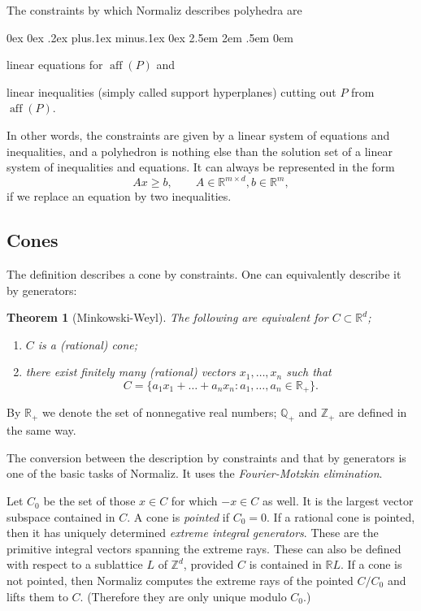 \documentclass[12pt,a4paper]{scrartcl}
\newcounter{listi}
\newcommand{\stdli}{ \topsep0ex \partopsep0ex %
\parsep.2ex plus.1ex minus.1ex \itemsep0ex%
\leftmargin2.5em \labelwidth2em \labelsep.5em \rightmargin0em}%
\newenvironment{arab}{\begin{list}{\textup{(\arabic{listi})}}%
	{\usecounter{listi}\stdli}}{\end{list}}
\newtheorem{theorem}{Theorem}
\theoremstyle{definition}
\def\ZZ{{\mathbb Z}}
\def\QQ{{\mathbb Q}}
\def\RR{{\mathbb R}}
\DeclareMathOperator{\aff}{aff}
\begin{document}
The constraints by which Normaliz describes polyhedra are
\begin{arab}
	\item linear equations for $\aff(P)$ and
	\item linear inequalities (simply called support hyperplanes) cutting out $P$ from $\aff(P)$.
\end{arab}
In other words, the constraints are given by a linear system of equations and inequalities, and a polyhedron is nothing else than the solution set of a linear system of inequalities and equations. It can always be represented in the form
$$
Ax\ge b, \qquad A\in\RR^{m\times d}, b\in \RR^m,
$$
if we replace an equation by two inequalities.

\subsection{Cones}

The definition describes a cone by constraints. One can equivalently describe it by generators:

\begin{theorem}[Minkowski-Weyl]
	The following are equivalent for $C\subset\RR^d$;
	\begin{enumerate}
		\item $C$ is a (rational) cone;
		\item there exist finitely many (rational) vectors $x_1,\dots,x_n$ such that
		$$
		C=\{a_1x_1+\dots+a_nx_n:a_1,\dots,a_n\in\RR_+\}.
		$$
	\end{enumerate}
\end{theorem}

By $\RR_+$ we denote the set of nonnegative real numbers; $\QQ_+$ and $\ZZ_+$ are defined in the same way.

The conversion between the description by constraints and that by generators is one of the basic tasks of Normaliz. It uses the \emph{Fourier-Motzkin elimination}.

Let $C_0$ be the set of those $x\in C$ for which $-x\in C$ as well. It is the largest vector subspace contained in $C$. 
A cone is \emph{pointed} if $C_0=0$. If a rational cone is pointed, then it has uniquely determined \emph{extreme integral generators}. These are the primitive integral vectors spanning the extreme rays. These can also be defined with respect to a sublattice $L$ of $\ZZ^d$, provided $C$ is contained in $\RR L$. If a cone is not pointed, then Normaliz computes the extreme rays of the pointed $C/C_0$ and lifts them to $C$. (Therefore they are only unique modulo $C_0$.)
\end{document}
